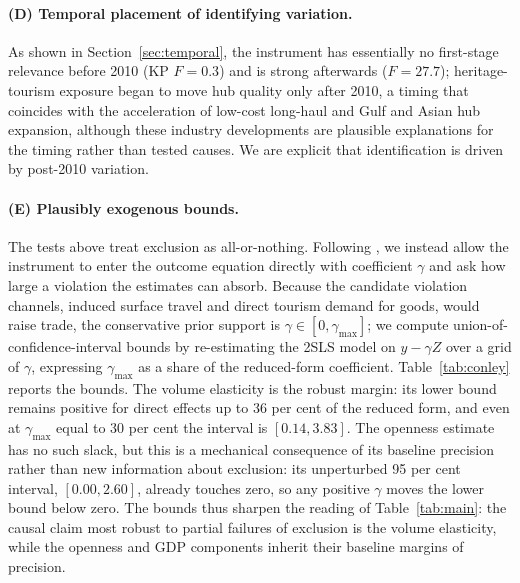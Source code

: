 \paragraph{(D) Temporal placement of identifying variation.} As shown in
Section~\ref{sec:temporal}, the instrument has essentially no first-stage
relevance before 2010 (KP $F=0.3$) and is strong afterwards ($F=27.7$);
heritage-tourism exposure began to move hub quality only after 2010, a timing
that coincides with the acceleration of low-cost long-haul and Gulf and Asian
hub expansion, although these industry developments are plausible
explanations for the timing rather than tested causes. We are explicit that
identification is driven by post-2010 variation.

\paragraph{(E) Plausibly exogenous bounds.} The tests above treat exclusion as
all-or-nothing. Following \citet{Conley_2012}, we instead allow the instrument
to enter the outcome equation directly with coefficient $\gamma$ and ask how
large a violation the estimates can absorb. Because the candidate violation
channels, induced surface travel and direct tourism demand for goods, would
raise trade, the conservative prior support is $\gamma\in[0,\gamma_{\max}]$;
we compute union-of-confidence-interval bounds by re-estimating the 2SLS model
on $y-\gamma Z$ over a grid of $\gamma$, expressing $\gamma_{\max}$ as a share
of the reduced-form coefficient. Table~\ref{tab:conley} reports the bounds.
The volume elasticity is the robust margin: its lower bound remains positive
for direct effects up to 36 per cent of the reduced form, and even at
$\gamma_{\max}$ equal to 30 per cent the interval is $[0.14, 3.83]$. The
openness estimate has no such slack, but this is a mechanical consequence of
its baseline precision rather than new information about exclusion: its
unperturbed 95 per cent interval, $[0.00, 2.60]$, already touches zero, so any
positive $\gamma$ moves the lower bound below zero. The bounds thus sharpen
the reading of Table~\ref{tab:main}: the causal claim most robust to partial
failures of exclusion is the volume elasticity, while the openness and GDP
components inherit their baseline margins of precision.

